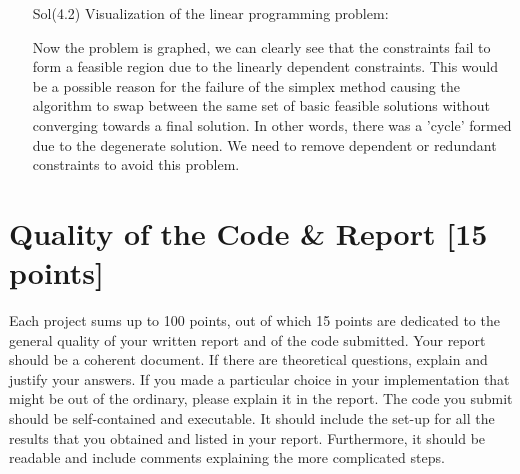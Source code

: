 \documentclass[unicode,11pt,a4paper,oneside,numbers=endperiod,openany]{scrartcl}
\begin{document}
\begin{enumerate}
 \item[Sol(4.2)] Visualization of the linear programming problem:
 \begin{center}
\end{center}
Now the problem is graphed, we can clearly see that the constraints fail to form a feasible region due to the linearly dependent constraints. This would be a possible reason for the failure of the simplex method causing the algorithm to swap between the same set of basic feasible solutions without converging towards a final solution. In other words, there was a 'cycle' formed due to the degenerate solution. We need to remove dependent or redundant constraints to avoid this problem.
\end{enumerate}


\section{Quality of the Code \& Report [15 points]}

Each project sums up to 100 points, out of which 15 points are dedicated to the general quality of your written report and of the code submitted. Your report should be a coherent document. If there are theoretical questions, explain and justify your answers. If you made a particular choice in your implementation that might be out of the ordinary, please explain it in the report. The code you submit should be self-contained and executable. It should include the set-up for all the results that you obtained and listed in your report. Furthermore, it should be readable and include comments explaining the more complicated steps.
\end{document}
